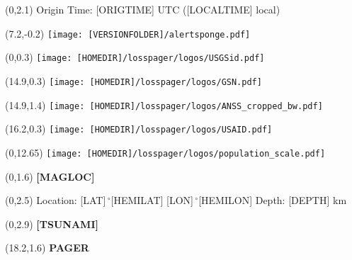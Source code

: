 \documentclass[6pt]{article}
\begin{document}
\selectfont

\begin{textblock}{13.75}(0,2.1)
Origin Time: [ORIGTIME] UTC ([LOCALTIME] local) 
\end{textblock}

\begin{textblock}{5.5}(7.2,-0.2)
\texttt{[image: [VERSIONFOLDER]/alertsponge.pdf]}
\end{textblock}
\begin{textblock}{3.2}(0,0.3)
\texttt{[image: [HOMEDIR]/losspager/logos/USGSid.pdf]}
\end{textblock}
\begin{textblock}{1.1}(14.9,0.3)
\texttt{[image: [HOMEDIR]/losspager/logos/GSN.pdf]}
\end{textblock}
\begin{textblock}{1.8}(14.9,1.4)
\texttt{[image: [HOMEDIR]/losspager/logos/ANSS\_cropped\_bw.pdf]}
\end{textblock}
\begin{textblock}{3.75}(16.2,0.3)
\texttt{[image: [HOMEDIR]/losspager/logos/USAID.pdf]}
\end{textblock}
\begin{textblock}{13.75}(0,12.65)
\texttt{[image: [HOMEDIR]/losspager/logos/population\_scale.pdf]}
\end{textblock}

\begin{textblock}{13.75}(0,1.6)
\fontsize{15}{18}\textbf{[MAGLOC]}
\end{textblock}



\begin{textblock}{13.75}(0,2.5)
Location: [LAT]$\,^{\circ}$[HEMILAT] [LON]$\,^{\circ}$[HEMILON] Depth: [DEPTH] km
\end{textblock}

\begin{textblock}{18}(0,2.9)
{\color{red}\textbf{[TSUNAMI]}}
\end{textblock}

\begin{textblock}{8}(18.2,1.6)
\fontsize{15}{18}\textbf{PAGER}
\end{textblock}
\end{document}
